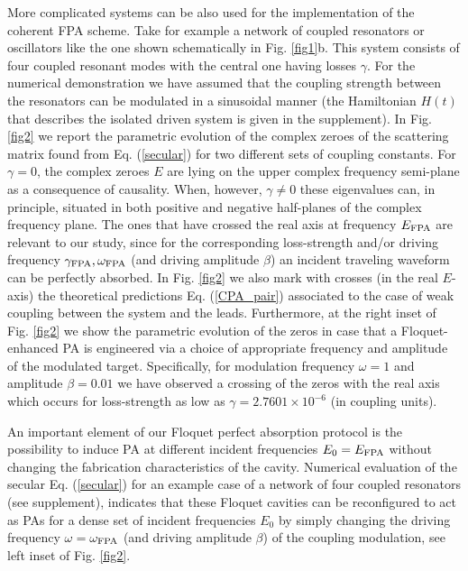 \documentclass[aps,prl,twocolumn,showpacs,groupedaddress,amsmath,amssymb]{revtex4}
\begin{document}
More complicated systems can be also used for the implementation of the coherent FPA scheme. Take for example a network of coupled 
resonators or oscillators like the one shown schematically in Fig. \ref{fig1}b. This system consists of four coupled resonant modes 
with the central one having losses $\gamma$. For 
the numerical demonstration we have assumed that the coupling strength between the resonators can be modulated in a sinusoidal 
manner (the Hamiltonian $H(t)$ that describes the isolated driven system is given in the supplement). In Fig. \ref{fig2} we report the 
parametric evolution of the complex zeroes of the scattering matrix found from Eq. (\ref{secular}) for two different sets of coupling constants. 
For $\gamma=0$, the complex zeroes $E$ are lying on the upper complex frequency semi-plane as a consequence of causality. 
When, however, $\gamma\neq 0$ these eigenvalues can, in principle, situated in both positive and negative half-planes of the complex 
frequency plane. The ones that have crossed the real axis at frequency $E_{\rm FPA}$ are relevant to our study, since for the 
corresponding loss-strength and/or driving frequency $\gamma_{\rm FPA}, \omega_{\rm FPA}$ (and driving amplitude $\beta$) 
an incident traveling waveform can be perfectly absorbed. In Fig. \ref{fig2} we also mark with crosses (in the real $E$-axis) the 
theoretical predictions Eq. (\ref{CPA_pair}) associated to the case of weak coupling between the system and the leads. Furthermore,
at the right inset of Fig. \ref{fig2} we show 
the parametric evolution of the zeros in case that a Floquet-enhanced PA is engineered via a choice of appropriate
frequency and amplitude of the modulated target. Specifically, for modulation frequency $\omega=1$ and amplitude $\beta=0.01$ 
we have observed a crossing of the zeros with the real axis which occurs for loss-strength as low as $\gamma= 2.7601\times 
10^{-6}$ (in coupling units).

An important element of our Floquet perfect absorption protocol is the possibility to induce PA at different incident frequencies $E_0
=E_{\rm FPA}$ without changing the fabrication characteristics of the cavity. Numerical evaluation of the secular Eq. (\ref{secular}) 
for an example case of a network of four coupled resonators (see supplement), indicates that these Floquet cavities can be reconfigured 
to act as PAs for a dense set of incident frequencies $E_0$  by simply changing the driving frequency $\omega=\omega_{\rm FPA}$ 
(and driving amplitude $\beta$) of the coupling modulation, see left inset of Fig. \ref{fig2}.
\end{document}
